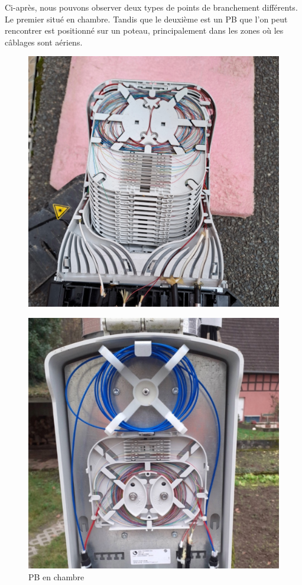 \documentclass[12pt, a4paper]{article}
\begin{document}
\newpage
Ci-après, nous pouvons observer deux types de points de branchement
différents. Le premier situé en chambre. Tandis que le deuxième est un \gls{PB} que l'on peut
rencontrer est positionné sur un poteau, principalement dans les zones où
les câblages sont aériens.
\begin{figure}[htbp]
    \centering
    \begin{minipage}[b]{0.4\textwidth}
		{\includegraphics[width=\textwidth]{img/pbc.jpg}}
      \caption{PB en chambre}
    \end{minipage}
    \hspace{0.5cm} %
    \begin{minipage}[b]{0.4\textwidth}
      \includegraphics[width=\textwidth]{img/pbp.jpg}

\end{minipage}
\end{figure}
\end{document}
